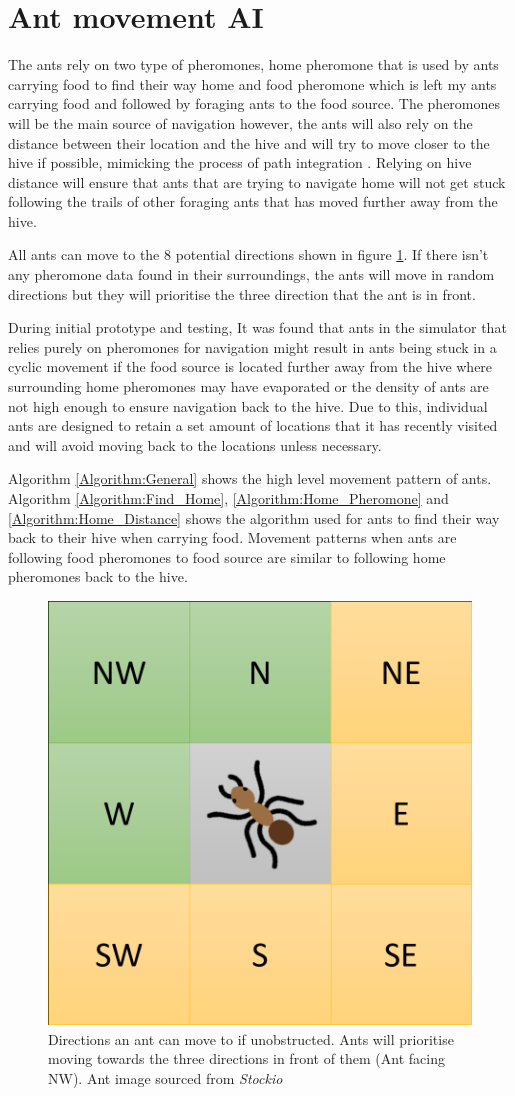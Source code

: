 \documentclass[a4paper, oneside, 11pt]{report}
\begin{document}
\section{Ant movement AI}
The ants rely on two type of pheromones, home pheromone that is used by ants carrying food to find their way home and food pheromone which is left my ants carrying food and followed by foraging ants to the food source. The pheromones will be the main source of navigation however, the ants will also rely on the distance between their location and the hive and will try to move closer to the hive if possible, mimicking the process of path integration \citep{Ant_Path_Integration}. Relying on hive distance will ensure that ants that are trying to navigate home will not get stuck following the trails of other foraging ants that has moved further away from the hive.

All ants can move to the 8 potential directions shown in figure \ref{fig:Ant_Direction}. If there isn't any pheromone data found in their surroundings, the ants will move in random directions but they will prioritise the three direction that the ant is in front. 

During initial prototype and testing, It was found that ants in the simulator that relies purely on pheromones for navigation might result in ants being stuck in a cyclic movement if the food source is located further away from the hive where surrounding home pheromones may have evaporated or the density of ants are not high enough to ensure navigation back to the hive. Due to this, individual ants are designed to retain a set amount of locations that it has  recently visited and will avoid moving back to the locations unless necessary. 

Algorithm \ref{Algorithm:General} shows the high level movement pattern of ants. Algorithm \ref{Algorithm:Find_Home}, \ref{Algorithm:Home_Pheromone} and \ref{Algorithm:Home_Distance} shows the algorithm used for ants to find their way back to their hive when carrying food. Movement patterns when ants are following food pheromones to food source are similar to following home pheromones back to the hive.

\begin{figure}[htb]
	\begin{center}
	\includegraphics[width=0.35 \columnwidth]{Ant_direction.png}
	\caption{Directions an ant can move to if unobstructed. Ants will prioritise moving towards the three directions in front of them (Ant facing NW). Ant image sourced from \textit{Stockio}}
	\label{fig:Ant_Direction}
	\end{center}
\end{figure}
\end{document}
